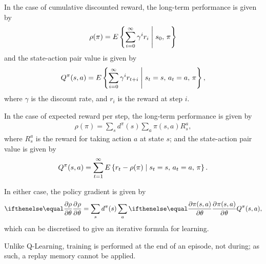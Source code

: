 In the case of cumulative discounted reward, the long-term performance is given
by
\begin{align*}
    \rho(\pi) = E\left\{ \sum_{i=0}^{\infty} \gamma^{i}r_{i}
    \;\middle|\; s_0,\, \pi \right\}
\end{align*}
and the state-action pair value is given by
\begin{align*}
    Q^\pi(s,a) = E\left\{ \sum_{i=0}^{\infty} \gamma^{i}r_{t+i}
    \;\middle|\; s_t=s,\, a_t=a,\, \pi \right\},
\end{align*}
where $\gamma$ is the discount rate, and $r_i$ is the reward at step $i$.

In the case of expected reward per step, the long-term performance is given by
\begin{align*}
    \rho(\pi) = \sum_s d^\pi(s) \sum_a \pi(s,a) R_s^a,
\end{align*}
where $R_s^a$ is the reward for taking action $a$ at state $s$;
and the state-action pair value is given by
\begin{align*}
    Q^\pi(s,a) = \sum_{t=1}^{\infty} E\left\{ r_t - \rho(\pi)
    \;\middle|\; s_t=s,\, a_t=a,\, \pi \right\}.
\end{align*}

In either case, the policy gradient is given by
\begin{align*}
    \Rpdiff{\rho}{\theta} = \sum_s d^\pi(s) \sum_a \Rpdiff{\pi(s,a)}{\theta} Q^\pi(s,a),
\end{align*}
which can be discretised to give an iterative formula for learning.

Unlike Q-Learning, training is performed at the end of an episode, not during;
as such, a replay memory cannot be applied.
